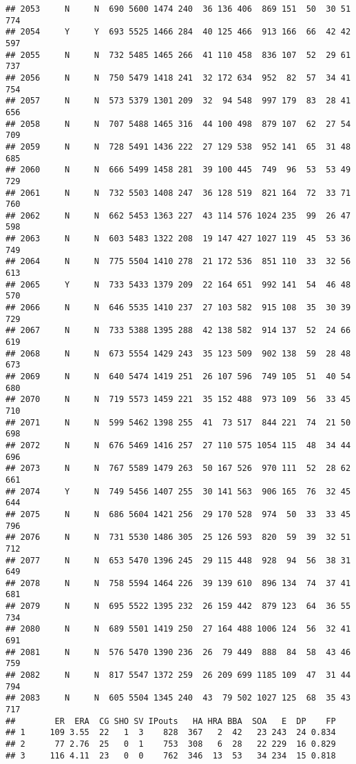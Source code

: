 \documentclass[]{article}
\begin{document}
\begin{verbatim}
## 2053     N     N  690 5600 1474 240  36 136 406  869 151  50  30 51  774
## 2054     Y     Y  693 5525 1466 284  40 125 466  913 166  66  42 42  597
## 2055     N     N  732 5485 1465 266  41 110 458  836 107  52  29 61  737
## 2056     N     N  750 5479 1418 241  32 172 634  952  82  57  34 41  754
## 2057     N     N  573 5379 1301 209  32  94 548  997 179  83  28 41  656
## 2058     N     N  707 5488 1465 316  44 100 498  879 107  62  27 54  709
## 2059     N     N  728 5491 1436 222  27 129 538  952 141  65  31 48  685
## 2060     N     N  666 5499 1458 281  39 100 445  749  96  53  53 49  729
## 2061     N     N  732 5503 1408 247  36 128 519  821 164  72  33 71  760
## 2062     N     N  662 5453 1363 227  43 114 576 1024 235  99  26 47  598
## 2063     N     N  603 5483 1322 208  19 147 427 1027 119  45  53 36  749
## 2064     N     N  775 5504 1410 278  21 172 536  851 110  33  32 56  613
## 2065     Y     N  733 5433 1379 209  22 164 651  992 141  54  46 48  570
## 2066     N     N  646 5535 1410 237  27 103 582  915 108  35  30 39  729
## 2067     N     N  733 5388 1395 288  42 138 582  914 137  52  24 66  619
## 2068     N     N  673 5554 1429 243  35 123 509  902 138  59  28 48  673
## 2069     N     N  640 5474 1419 251  26 107 596  749 105  51  40 54  680
## 2070     N     N  719 5573 1459 221  35 152 488  973 109  56  33 45  710
## 2071     N     N  599 5462 1398 255  41  73 517  844 221  74  21 50  698
## 2072     N     N  676 5469 1416 257  27 110 575 1054 115  48  34 44  696
## 2073     N     N  767 5589 1479 263  50 167 526  970 111  52  28 62  661
## 2074     Y     N  749 5456 1407 255  30 141 563  906 165  76  32 45  644
## 2075     N     N  686 5604 1421 256  29 170 528  974  50  33  33 45  796
## 2076     N     N  731 5530 1486 305  25 126 593  820  59  39  32 51  712
## 2077     N     N  653 5470 1396 245  29 115 448  928  94  56  38 31  649
## 2078     N     N  758 5594 1464 226  39 139 610  896 134  74  37 41  681
## 2079     N     N  695 5522 1395 232  26 159 442  879 123  64  36 55  734
## 2080     N     N  689 5501 1419 250  27 164 488 1006 124  56  32 41  691
## 2081     N     N  576 5470 1390 236  26  79 449  888  84  58  43 46  759
## 2082     N     N  817 5547 1372 259  26 209 699 1185 109  47  31 44  794
## 2083     N     N  605 5504 1345 240  43  79 502 1027 125  68  35 43  717
##        ER  ERA  CG SHO SV IPouts   HA HRA BBA  SOA   E  DP    FP
## 1     109 3.55  22   1  3    828  367   2  42   23 243  24 0.834
## 2      77 2.76  25   0  1    753  308   6  28   22 229  16 0.829
## 3     116 4.11  23   0  0    762  346  13  53   34 234  15 0.818

\end{verbatim}
\end{document}
